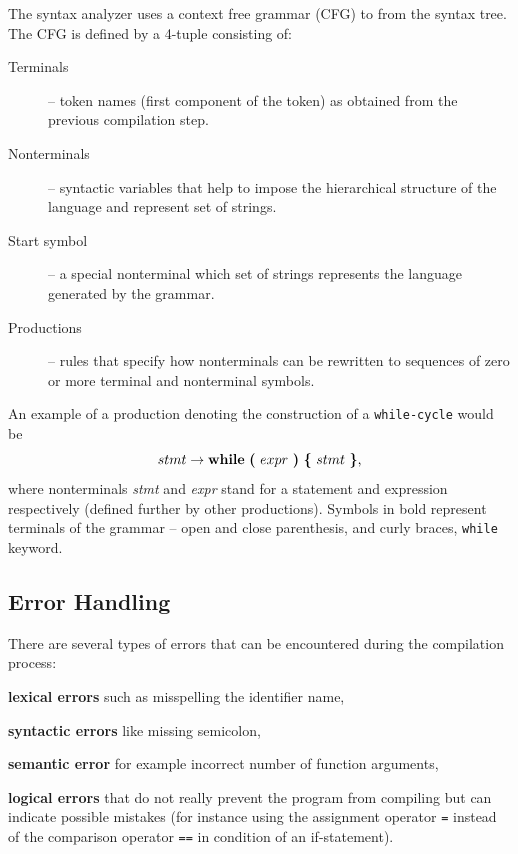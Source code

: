 \documentclass[
  digital, %
  table,   %
  lof,     %
  lot,     %
  oneside,
]{fithesis3}
\begin{document}
The syntax analyzer uses a context free grammar (CFG) to from the syntax tree. The CFG is defined by a 4-tuple consisting of:
\begin{description}
  \item[Terminals] -- token names (first component of the token) as obtained from the previous compilation step.
  \item[Nonterminals] -- syntactic variables that help to impose the hierarchical structure of the language and represent set of strings.
  \item[Start symbol] -- a special nonterminal which set of strings represents the language generated by the grammar.
  \item[Productions] -- rules that specify how nonterminals can be rewritten to sequences of zero or more terminal and nonterminal symbols. 
\end{description}

An example of a production denoting the construction of a \texttt{while-cycle} would be
\begin{equation}
  stmt 
  \rightarrow 
  \textbf{while}\ 
  \textbf{(}\ expr\ \textbf{)}\ 
  \textbf{\{}\ stmt\ \textbf{\}} 
  \textnormal{,}
\end{equation}
\noindent
where nonterminals \textit{stmt} and \textit{expr} stand for a statement and expression respectively (defined further by other productions). Symbols in bold represent terminals of the grammar -- open and close parenthesis, and curly braces, \texttt{while} keyword.

  \subsection{Error Handling}
There are several types of errors that can be encountered during the compilation process:
\begin{compactitem}
  \item\textbf{lexical errors} such as misspelling the identifier name,
  \item\textbf{syntactic errors} like missing semicolon,
  \item\textbf{semantic error} for example incorrect number of function arguments,
  \item\textbf{logical errors} that do not really prevent the program from compiling but can indicate possible mistakes (for instance using the assignment operator \texttt{=} instead of the comparison operator \texttt{==} in condition of an if-statement).
\end{compactitem} 
\end{document}
